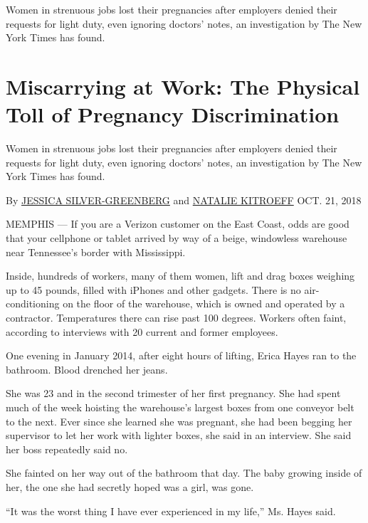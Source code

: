 Women in strenuous jobs lost their pregnancies after employers denied
their requests for light duty, even ignoring doctors' notes, an
investigation by The New York Times has found.

\hypertarget{miscarrying-at-work-the-physical-toll-of-pregnancy-discrimination-1}{%
\section{Miscarrying at Work: The Physical Toll of Pregnancy
Discrimination}\label{miscarrying-at-work-the-physical-toll-of-pregnancy-discrimination-1}}

Women in strenuous jobs lost their pregnancies after employers denied
their requests for light duty, even ignoring doctors' notes, an
investigation by The New York Times has found.

By
\href{https://www.nytimes3xbfgragh.onion/by/jessica-silver-greenberg}{JESSICA
SILVER-GREENBERG} and
\href{https://www.nytimes3xbfgragh.onion/by/natalie-kitroeff}{NATALIE
KITROEFF} OCT. 21, 2018

MEMPHIS --- If you are a Verizon customer on the East Coast, odds are
good that your cellphone or tablet arrived by way of a beige, windowless
warehouse near Tennessee's border with Mississippi.

Inside, hundreds of workers, many of them women, lift and drag boxes
weighing up to 45 pounds, filled with iPhones and other gadgets. There
is no air-conditioning on the floor of the warehouse, which is owned and
operated by a contractor. Temperatures there can rise past 100 degrees.
Workers often faint, according to interviews with 20 current and former
employees.

One evening in January 2014, after eight hours of lifting, Erica Hayes
ran to the bathroom. Blood drenched her jeans.

She was 23 and in the second trimester of her first pregnancy. She had
spent much of the week hoisting the warehouse's largest boxes from one
conveyor belt to the next. Ever since she learned she was pregnant, she
had been begging her supervisor to let her work with lighter boxes, she
said in an interview. She said her boss repeatedly said no.

She fainted on her way out of the bathroom that day. The baby growing
inside of her, the one she had secretly hoped was a girl, was gone.

``It was the worst thing I have ever experienced in my life,'' Ms. Hayes
said.

